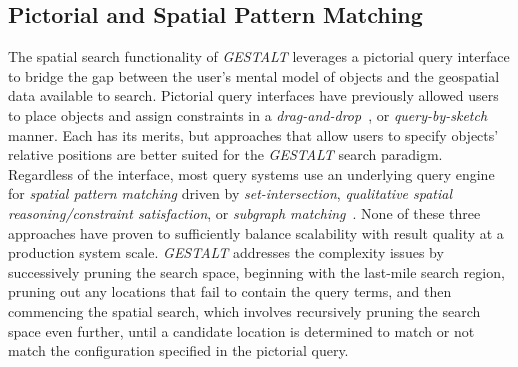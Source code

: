 \subsection{Pictorial and Spatial Pattern Matching}
\par{The spatial search functionality of \emph{GESTALT} leverages a pictorial query interface to bridge the gap between the user's mental model of objects and the geospatial data available to search. 
%
Pictorial query interfaces have previously allowed users to place objects and assign constraints in a \textit{drag-and-drop}~\cite{DiLoreto1996, Soffer1997, Soffer1998a, Folkers2000}, or \textit{query-by-sketch}~\cite{Schwering2014} manner. Each has its merits, but approaches that allow users to specify objects' relative positions are better suited for the \emph{GESTALT} search paradigm. 
%
Regardless of the interface, most query systems use an underlying query engine for \textit{spatial pattern matching} driven by \textit{set-intersection}, \textit{qualitative spatial reasoning/constraint satisfaction}, or \textit{subgraph matching}~\cite{Osul2023}.
None of these three approaches have proven to sufficiently balance scalability with result quality at a production system scale. 
%
\textit{GESTALT} addresses the complexity issues by successively pruning the search space, beginning with the last-mile search region, pruning out any locations that fail to contain the query terms, and then commencing the spatial search, which involves recursively pruning the search space even further, until a candidate location is determined to match or not match the configuration specified in the pictorial query.}



